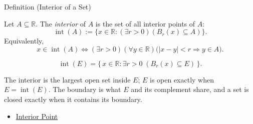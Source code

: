 \begin{definitionbox}{Definition (Interior of a Set)}
\begin{definition}
\label{def:interior-of-set}
Let $A\subseteq\mathbb{R}$.  The \emph{interior} of $A$ is the set of all
interior points of $A$:
\[
  \operatorname{int}(A)
  :=
  \{x\in\mathbb{R}:(\exists r>0)(B_r(x)\subseteq A)\}.
\]
Equivalently,
\[
  x\in\operatorname{int}(A)
  \Longleftrightarrow
  (\exists r>0)(\forall y\in\mathbb{R})
  \bigl(|x-y|<r\Longrightarrow y\in A\bigr).
\]
\end{definition}
\end{definitionbox}
\begin{remark*}
\[
\operatorname{int}(E)=\{\,x\in\mathbb{R}: \exists r>0\;(B_r(x)\subseteq E)\,\}.
\]
\end{remark*}
\begin{remark*}[Interpretation]
The interior is the largest open set inside $E$; $E$ is open exactly when $E=\operatorname{int}(E)$. The boundary is what $E$ and its complement share, and a set is closed exactly when it contains its boundary.
\end{remark*}
\begin{dependencies}
\begin{itemize}
  \item \hyperref[def:interior-point]{Interior Point}
\end{itemize}
\end{dependencies}
